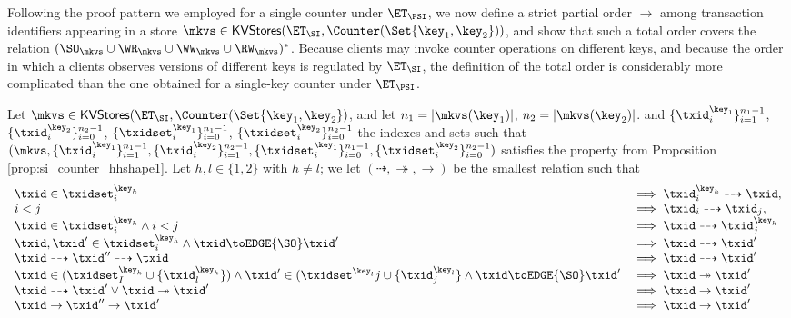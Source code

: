 Following the proof pattern we employed for a single counter under $\ET_{\PSI}$, we now 
define a strict partial order $\rightarrow$ among transaction identifiers appearing in a store 
$\mkvs \in \mathsf{KVStores}(\ET_{\SI},  \Counter(\Set{\key_1, \key_2}))$, and show that such a 
total order covers the relation $(\SO_{\mkvs} \cup \WR_{\mkvs} \cup \WW_{\mkvs} \cup \RW_{\mkvs})^{\ast}$. 
Because clients may invoke counter operations on different keys, and because the 
order in which a clients observes versions of different keys is regulated by $\ET_{\SI}$, 
the definition of the total order is considerably more complicated than the one 
obtained for a single-key counter under $\ET_\PSI$.

\begin{definition}
\label{def:si_counter_order}
Let $\mkvs \in \mathsf{KVStores}(\ET_{\SI}, \Counter(\Set{\key_1, \key_2})$, and let 
$n_1 = \lvert \mkvs(\key_1) \rvert$, $n_2 = \lvert \mkvs(\key_2) \rvert$. 
and $\{\txid_{i}^{\key_1}\}_{i=1}^{n_1 - 1}$, $\{\txid_{i}^{\key_2}\}_{i=0}^{n_2 - 1}$, 
$\{\txidset_{i}^{\key_1}\}_{i=0}^{n_1-1}$, $\{\txidset_{i}^{\key_2}\}_{i=0}^{n_2 - 1}$ the indexes 
and sets such that $(\mkvs, \{\txid_{i}^{\key_{1}}\}_{i=1}^{n_1 - 1}, \{\txid^{\key_2}_{i}\}_{i=1}^{n_2 - 1}, 
\{\txidset_{i}^{\key_1}\}_{i=0}^{n_1 - 1}, \{\txidset_{i}^{\key_2}\}_{i=0}^{n_2-1})$ satisfies the property from 
Proposition \ref{prop:si_counter_hhshape1}. Let $h, l \in \{1,2\}$ with $h \neq l$; we 
let $(\dashrightarrow, \twoheadrightarrow, \rightarrow)$ be the smallest relation such that 
\[
\begin{array}{ll}
\txid \in \txidset^{\key_{h}}_{i} &\implies \txid^{\key_{h}}_{i} \dashrightarrow \txid,\\
i < j &\implies \txid_{i} \dashrightarrow \txid_{j},\\
\txid \in \txidset^{\key_{h}}_{i} \land i < j & \implies \txid \dashrightarrow \txid^{\key_{h}}_{j}\\
\txid, \txid' \in \txidset^{\key_{h}}_{i} \land \txid \toEDGE{\SO} \txid' &\implies \txid \dashrightarrow \txid'\\
\txid \dashrightarrow \txid'' \dashrightarrow \txid &\implies \txid \dashrightarrow \txid'\\
\txid \in (\txidset^{\key_{h}}_{I} \cup \{\txid^{\key_{h}}_{l}\}) \land \txid' \in (\txidset^{\key_{l}}{j} \cup \{\txid^{\key_l}_{j}\} \land \txid \toEDGE{\SO} \txid' &\implies \txid \twoheadrightarrow \txid'\\
\txid \dashrightarrow \txid' \vee \txid \twoheadrightarrow \txid' &\implies \txid \rightarrow \txid'\\
\txid \rightarrow \txid'' \rightarrow \txid' &\implies \txid \rightarrow \txid'
\end{array}
\]
%
\end{definition}
